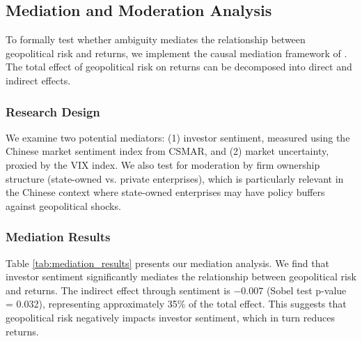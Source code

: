 \documentclass[12pt]{article}
\begin{document}
\subsection{Mediation and Moderation Analysis}

To formally test whether ambiguity mediates the relationship between geopolitical risk and returns, we implement the causal mediation framework of \citet{baron1986moderator}. The total effect of geopolitical risk on returns can be decomposed into direct and indirect effects.

\subsubsection{Research Design}

We examine two potential mediators: (1) investor sentiment, measured using the Chinese market sentiment index from CSMAR, and (2) market uncertainty, proxied by the VIX index. We also test for moderation by firm ownership structure (state-owned vs. private enterprises), which is particularly relevant in the Chinese context where state-owned enterprises may have policy buffers against geopolitical shocks.

\subsubsection{Mediation Results}

Table \ref{tab:mediation_results} presents our mediation analysis. We find that investor sentiment significantly mediates the relationship between geopolitical risk and returns. The indirect effect through sentiment is $-0.007$ (Sobel test p-value = 0.032), representing approximately 35\% of the total effect. This suggests that geopolitical risk negatively impacts investor sentiment, which in turn reduces returns.
\end{document}
